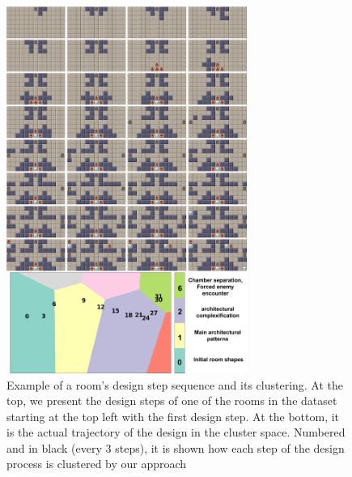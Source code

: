 
\begin{figure}[t]
\centerline{\includegraphics[width=0.7\textwidth]{figures/figure3.png}}
\caption{
Example of a room's design step sequence and its clustering. At the top, we present the design steps of one of the rooms in the dataset starting at the top left with the first design step. At the bottom, it is the actual trajectory of the design in the cluster space. Numbered and in black (every 3 steps), it is shown how each step of the design process is clustered by our approach} \label{fig:paths-designers}
\end{figure}

